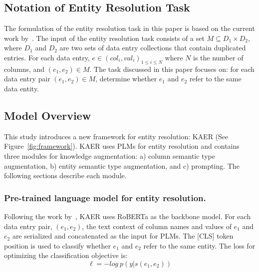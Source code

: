 


\subsection{Notation of Entity Resolution Task}
The formulation of the entity resolution task in this paper is based on the current work by~\citet{li_deep_2020}. The input of the entity resolution task consists of a set $M \subseteq D_1 \times D_2$, where $D_1$ and $D_2$ are two sets of data entry collections that contain duplicated entries.  
For each data entry, $e \in {(col_i, val_i)}_{1 \leq i \leq N}$ where $N$ is the number of columns, and $(e_1, e_2) \in M$. The task discussed in this paper focuses on: for each data entry pair $(e_1, e_2) \in M$, determine whether $e_1$ and $e_2$ refer to the same data entity.

\subsection{Model Overview}
This study introduces a new framework for entity resolution: KAER (See Figure~\ref{fig:framework}). 
KAER uses PLMs for entity resolution and contains three modules for knowledge augmentation: a) column semantic type augmentation, b) entity semantic type augmentation, and c) prompting. 
The following sections describe each module.


\subsubsection{Pre-trained language model for entity resolution.}
Following the work by~\citet{li_deep_2020}, KAER uses RoBERTa as the backbone model. For each data entry pair, $(e_1, e_2)$, 
 the text context of column names and values of $e_1$ and $e_2$ are serialized and concatenated as the input for PLMs. The [CLS] token position is used to classify whether $e_1$ and $e_2$ refer to the same entity. 
The loss for optimizing the classification objective is:
\begin{equation}
    \ell = - log\ p(y | s(e_1, e_2))
\end{equation}

